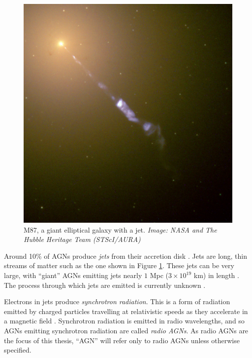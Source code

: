         \begin{figure}
            \centering
            \includegraphics[height=0.3\textheight]{images/M87_jet.jpg}
            \caption{M87, a giant elliptical galaxy with a jet. \emph{Image:
                NASA and The Hubble Heritage Team (STScI/AURA)}}
            \label{fig:m87}
        \end{figure}

        Around 10\% of AGNs produce \emph{jets} from their accretion disk
        \citep{fabian99}. Jets are long, thin streams of matter such as the one
        shown in Figure \ref{fig:m87}. These jets can be very large, with
        ``giant'' AGNs emitting jets nearly $1$ Mpc ($3 \times 10^{19}$ km) in
        length \citep{saripalli05}. The process through which jets are emitted
        is currently unknown \citeme.

        Electrons in jets produce \emph{synchrotron radiation}. This is a
        form of radiation emitted by charged particles travelling at
        relativistic speeds as they accelerate in a magnetic field
        \citep{sokolov67}. Synchrotron radiation is emitted in radio
        wavelengths, and so AGNs emitting synchrotron radiation are called
        \emph{radio AGNs}. As radio AGNs are the focus of this thesis, ``AGN''
        will refer only to radio AGNs unless otherwise specified.

